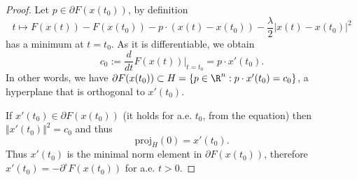 \begin{proof} Let $p\in \partial F(x(t_0))$, by definition
\begin{equation*}
    t\mapsto F(x(t)) - F(x(t_0)) - p\cdot \left(x(t)-x(t_0)\right) - \frac{\lambda}{2}\left|x(t) - x(t_0)\right|^2
\end{equation*}
has a minimum at $t=t_0$. As it is differentiable, we obtain
\begin{equation*}
    c_0 := \frac{d}{dt}F(x(t))\Big|_{t=t_0}  = p\cdot x'(t_0).
\end{equation*}
In other words, we have $\partial F(x(t_0))\subset H = \{p\in \R^n: p\cdot x'(t_0) = c_0 \}$, a hyperplane that is orthogonal to $x'(t_0)$. 

If $x'(t_0)\in \partial F(x(t_0))$ (it holds for a.e. $t_0$, from the equation) then $\Vert x'(t_0)\Vert^2 = c_0$ and thus 
\begin{equation*}
    \mathrm{proj}_H(0) = x'(t_0).
\end{equation*}
Thus $x'(t_0)$ is the minimal norm element in $\partial F(x(t_0))$, therefore $x'(t_0) = -\partial^\circ F(x(t_0))$ for a.e. $t>0$.
\end{proof}
